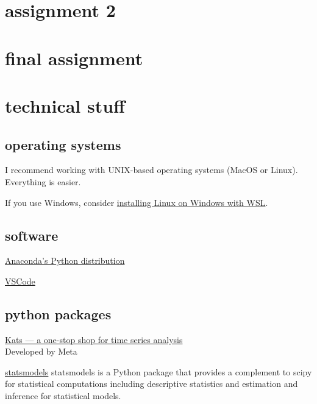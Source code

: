 \documentclass[
  letterpaper,
  DIV=11,
  numbers=noendperiod,
  oneside]{scrreprt}
\begin{document}
\hypertarget{assignment-2}{%
\chapter{assignment 2}\label{assignment-2}}

\hypertarget{final-assignment}{%
\chapter{final assignment}\label{final-assignment}}


\hypertarget{technical-stuff}{%
\chapter{technical stuff}\label{technical-stuff}}

\hypertarget{operating-systems}{%
\section{operating systems}\label{operating-systems}}

I recommend working with UNIX-based operating systems (MacOS or Linux).
Everything is easier.

If you use Windows, consider
\href{https://learn.microsoft.com/en-us/windows/wsl/install}{installing
Linux on Windows with WSL}.

\hypertarget{software}{%
\section{software}\label{software}}

\href{https://www.anaconda.com/download}{Anaconda's Python distribution}

\href{https://code.visualstudio.com/download}{VSCode}

\hypertarget{python-packages}{%
\section{python packages}\label{python-packages}}

\href{https://engineering.fb.com/2021/06/21/open-source/kats/}{Kats ---
a one-stop shop for time series analysis}\\
Developed by Meta

\href{https://www.statsmodels.org/stable/}{statsmodels} statsmodels is a
Python package that provides a complement to scipy for statistical
computations including descriptive statistics and estimation and
inference for statistical models.
\end{document}
